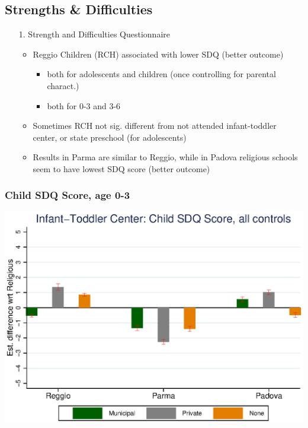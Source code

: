 \documentclass{beamer}
\begin{document}
\subsection{Strengths \& Difficulties}
\begin{frame}
\begin{itemize}
	\centering
	\item[1.] Strength and Difficulties Questionnaire
	\vspace{3ex}
	\begin{itemize}
		\item Reggio Children (RCH) associated with lower SDQ (better outcome)
		\begin{itemize}
			\item both for adolescents and children (once controlling for parental charact.)
			\item both for 0-3 and 3-6
		\end{itemize}
		\item Sometimes RCH not sig. different from not attended infant-toddler center, or state preschool (for adolescents)
		\vspace{2ex}
		\item Results in Parma are similar to Reggio, while in Padova religious schools seem to have lowest SDQ score (better outcome)
	\end{itemize}
\end{itemize}
\end{frame}
\begin{frame}\frametitle{Child SDQ Score, age 0-3}
\center
\includegraphics[scale=0.7]{../Output/graphs/CS_Asilo_Child_all.eps}
\end{frame}
\end{document}
